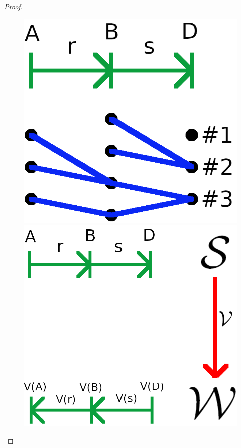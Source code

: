 \documentclass[12pt,a4paper]{article}
\theoremstyle{myrule}
\theoremstyle{postulate}
\theoremstyle{definition}
\begin{document}
\begin{proof}
 
\begin{figure}[h]
\centering
\includegraphics[scale=1.0]{functor1.png}
\hspace{1.5cm}
\includegraphics[scale=0.8]{functor2.png}
\end{figure}
  

\end{proof}
\end{document}
